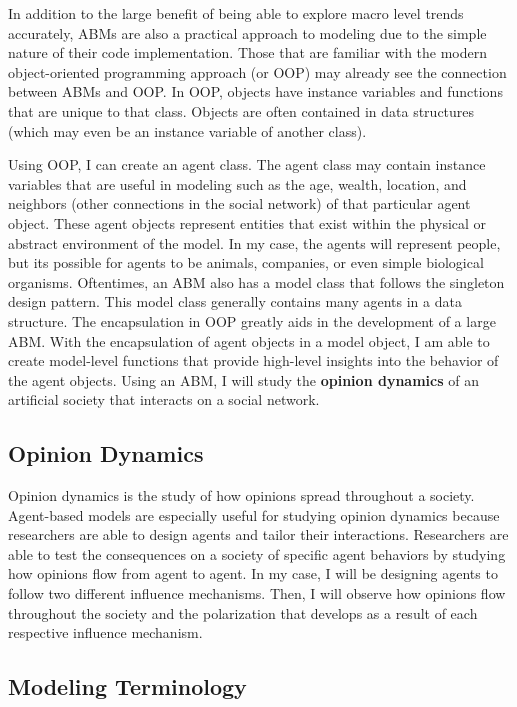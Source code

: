 In addition to the large benefit of being able to explore macro level trends accurately, ABMs are also a practical approach to modeling due to the simple nature of their code implementation. Those that are familiar with the modern object-oriented programming approach (or OOP) may already see the connection between ABMs and OOP. In OOP, objects have instance variables and functions that are unique to that class. Objects are often contained in data structures (which may even be an instance variable of another class). 

Using OOP, I can create an agent class. The agent class may contain instance variables that are useful in modeling such as the age, wealth, location, and neighbors (other connections in the social network) of that particular agent object. These agent objects represent entities that exist within the physical or abstract environment of the model. In my case, the agents will represent people, but its possible for agents to be animals, companies, or even simple biological organisms. Oftentimes, an ABM also has a model class that follows the singleton design pattern. This model class generally contains many agents in a data structure. The encapsulation in OOP greatly aids in the development of a large ABM. With the encapsulation of agent objects in a model object, I am able to create model-level functions that provide high-level insights into the behavior of the agent objects. Using an ABM, I will study the \textbf{opinion dynamics} of an artificial society that interacts on a social network.


\subsection{Opinion Dynamics}
Opinion dynamics is the study of how opinions spread throughout a society. Agent-based models are especially useful for studying opinion dynamics because researchers are able to design agents and tailor their interactions. Researchers are able to test the consequences on a society of specific agent behaviors by studying how opinions flow from agent to agent. In my case, I will be designing agents to follow two different influence mechanisms. Then, I will observe how opinions flow throughout the society and the polarization that develops as a result of each respective influence mechanism.

\subsection{Modeling Terminology}

